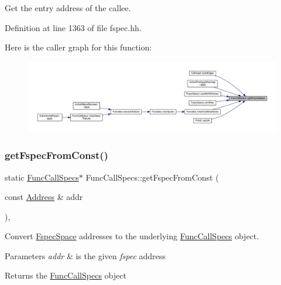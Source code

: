 Get the entry address of the callee. 



Definition at line 1363 of file fspec.\+hh.

Here is the caller graph for this function\+:
\nopagebreak
\begin{figure}[H]
\begin{center}
\leavevmode
\includegraphics[width=350pt]{class_func_call_specs_a0a5d18be6037559397af11e6764abbcd_icgraph}
\end{center}
\end{figure}
\mbox{\label{class_func_call_specs_aa1d084c81a9ae8656d7ef79c84398dc8}} 
\subsubsection{\texorpdfstring{getFspecFromConst()}{getFspecFromConst()}}
{\footnotesize\ttfamily static \mbox{\hyperlink{class_func_call_specs}{Func\+Call\+Specs}}$\ast$ Func\+Call\+Specs\+::get\+Fspec\+From\+Const (\begin{DoxyParamCaption}\item[{const \mbox{\hyperlink{class_address}{Address}} \&}]{addr }\end{DoxyParamCaption})\hspace{0.3cm}{\ttfamily [inline]}, {\ttfamily [static]}}



Convert \mbox{\hyperlink{class_fspec_space}{Fspec\+Space}} addresses to the underlying \mbox{\hyperlink{class_func_call_specs}{Func\+Call\+Specs}} object. 


\begin{DoxyParams}{Parameters}
{\em addr} & is the given {\itshape fspec} address \\
\hline
\end{DoxyParams}
\begin{DoxyReturn}{Returns}
the \mbox{\hyperlink{class_func_call_specs}{Func\+Call\+Specs}} object 
\end{DoxyReturn}


